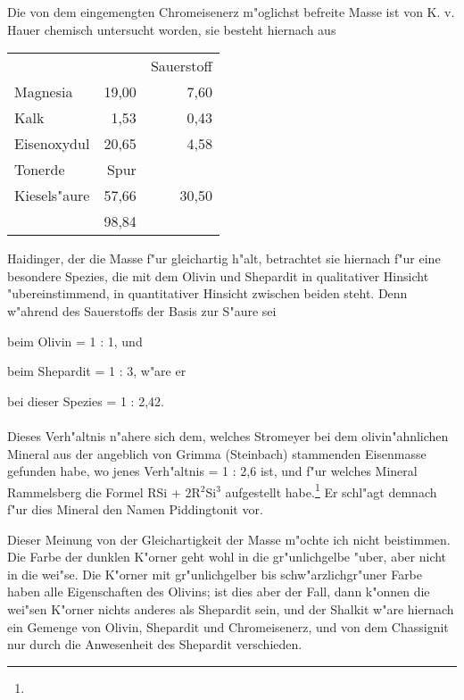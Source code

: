 \documentclass[a4paper, 11pt, oneside]{article}
\begin{document}
Die von dem eingemengten Chromeisenerz m"oglichst befreite Masse ist von K. v. Hauer chemisch untersucht worden, sie besteht hiernach aus
\begin{center}
\begin{tabular}{ l r r }
     & & Sauerstoff\\
    Magnesia & 19,00 & 7,60\\
    Kalk & 1,53 & 0,43\\
    Eisenoxydul & 20,65 & 4,58\\
    Tonerde & Spur & \\
    Kiesels"aure & 57,66 & 30,50\\
     & 98,84\\
\end{tabular}
\end{center}
Haidinger, der die Masse f"ur gleichartig h"alt, betrachtet sie hiernach f"ur eine besondere Spezies, die mit dem Olivin und Shepardit in qualitativer Hinsicht "ubereinstimmend, in quantitativer Hinsicht zwischen beiden steht. Denn w"ahrend des Sauerstoffs der Basis zur S"aure sei
\begin{center}
beim Olivin = 1 : 1, und  
\end{center}
\begin{center}
beim Shepardit = 1 : 3, w"are er  
\end{center}
\begin{center}
bei dieser Spezies = 1 : 2,42.  
\end{center}
\paragraph{}
Dieses Verh"altnis n"ahere sich dem, welches Stromeyer bei dem olivin"ahnlichen Mineral aus der angeblich von Grimma (Steinbach) stammenden Eisenmasse gefunden habe, wo jenes Verh"altnis = 1 : 2,6 ist, und f"ur welches Mineral Rammelsberg die Formel RSi + 2R$^{2}$Si$^{3}$ aufgestellt habe.\footnote{} Er schl"agt demnach f"ur dies Mineral den Namen Piddingtonit vor.

Dieser Meinung von der Gleichartigkeit der Masse m"ochte ich nicht beistimmen. Die Farbe der dunklen K"orner geht wohl in die gr"unlichgelbe "uber, aber nicht in die wei"se. Die K"orner mit gr"unlichgelber bis schw"arzlichgr"uner Farbe haben alle Eigenschaften des Olivins; ist dies aber der Fall, dann k"onnen die wei"sen K"orner nichts anderes als Shepardit sein, und der Shalkit w"are hiernach ein Gemenge von Olivin, Shepardit und Chromeisenerz, und von dem Chassignit nur durch die Anwesenheit des Shepardit verschieden.
\end{document}
